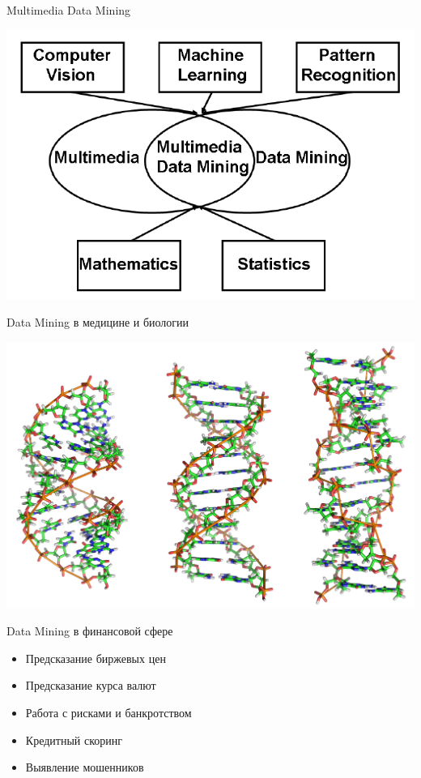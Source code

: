 \documentclass[10pt]{beamer}
\begin{document}
\begin{frame}{Multimedia Data Mining}

\begin{center}
\includegraphics[scale=0.325]{images/multimedia.png}
\end{center}

\end{frame}

\begin{frame}{Data Mining в медицине и биологии}

\begin{center}
\includegraphics[scale=1.5]{images/dna.png}
\end{center}

\end{frame}

\begin{frame}{Data Mining в финансовой сфере}

\begin{itemize}
\item Предсказание биржевых цен
\item Предсказание курса валют
\item Работа с рисками и банкротством
\item Кредитный скоринг
\item Выявление мошенников
\end{itemize}

\end{frame}
\end{document}
